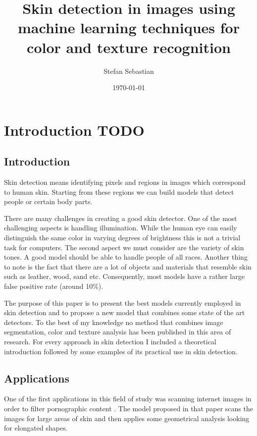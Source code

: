 \documentclass[12pt]{report}
\begin{document}
	\title{Skin detection in images using machine learning techniques for color and texture recognition}
	\author{Stefan Sebastian}
	\date{\today}
	\maketitle
	
	\newpage
	\tableofcontents
	\newpage
	
	\chapter{Introduction TODO}
	
	\section{Introduction}
	Skin detection means identifying pixels and regions in images which correspond to human skin. Starting from these regions we can build models that detect people or certain body parts.
	
	There are many challenges in creating a good skin detector. One of the most challenging aspects is handling illumination. While the human eye can easily distinguish the same color in varying degrees of brightness this is not a trivial task for computers. The second aspect we must consider are the variety of skin tones. A good model should be able to handle people of all races. Another thing to note is the fact that there are a lot of objects and materials that resemble skin such as leather, wood, sand etc. Consequently, most models have a rather large false positive rate (around 10\%).
	
	The purpose of this paper is to present the best models currently employed in skin detection and to propose a new model that combines some state of the art detectors. To the best of my knowledge no method that combines image segmentation, color and texture analysis has been published in this area of research. For every approach in skin detection I included a theoretical introduction followed by some examples of its practical use in skin detection.
	
	\section{Applications}
	One of the first applications in this field of study was scanning internet images in order to filter pornographic content \cite{finding_naked_people}. The model proposed in that paper scans the images for large areas of skin and then applies some geometrical analysis looking for elongated shapes.
	
\end{document}
